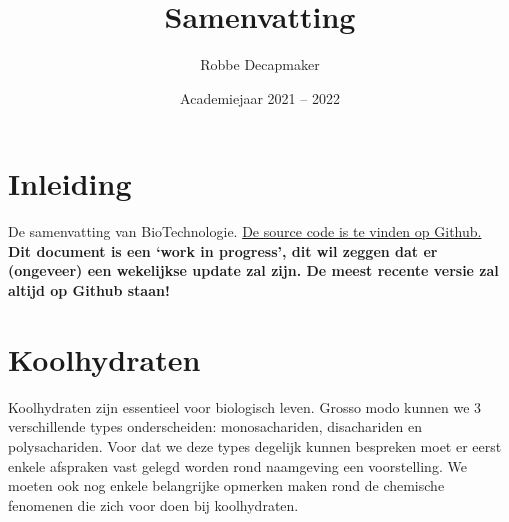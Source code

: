 \documentclass[a4paper,kul]{kulakarticle} %
\date{Academiejaar 2021 -- 2022}
\title{Samenvatting}
\author{Robbe Decapmaker}
\begin{document}
\maketitle

\section*{Inleiding}

De samenvatting van BioTechnologie. \href{https://github.com/debber1/BioTech}{De source code is te vinden op Github.}\\
\textbf{Dit document is een `work in progress', dit wil zeggen dat er (ongeveer) een wekelijkse update zal zijn. De meest recente versie zal altijd op Github staan!}
\tableofcontents
\newpage
\section{Koolhydraten}
Koolhydraten zijn essentieel voor biologisch leven. Grosso modo kunnen we 3 verschillende types onderscheiden: monosachariden, disachariden en polysachariden. Voor dat we deze types degelijk kunnen bespreken moet er eerst enkele afspraken vast gelegd worden rond naamgeving een voorstelling. We moeten ook nog enkele belangrijke opmerken maken rond de chemische fenomenen die zich voor doen bij koolhydraten. 
\end{document}
